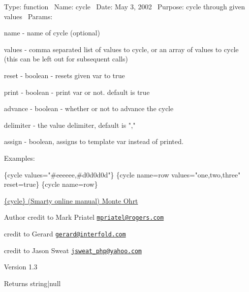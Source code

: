 Type\+: function~\newline
 Name\+: cycle~\newline
 Date\+: May 3, 2002~\newline
 Purpose\+: cycle through given values~\newline
 Params\+: 
\begin{DoxyPre}
\begin{DoxyItemize}
\item name      - name of cycle (optional)
\item values    - comma separated list of values to cycle, or an array of values to cycle
              (this can be left out for subsequent calls)
\item reset     - boolean - resets given var to true
\item print     - boolean - print var or not. default is true
\item advance   - boolean - whether or not to advance the cycle
\item delimiter - the value delimiter, default is ","
\item assign    - boolean, assigns to template var instead of printed.

Examples:~\newline


\begin{DoxyPre}
\{cycle values="#eeeeee,#d0d0d0d"\}
\{cycle name=row values="one,two,three" reset=true\}
\{cycle name=row\}
\end{DoxyPre}

\end{DoxyItemize}\end{DoxyPre}



\begin{DoxyPre}\hyperlink{}{\{cycle\}
      (Smarty online manual)
 Monte Ohrt }
\begin{DoxyAuthor}{Author}
credit to Mark Priatel \href{mailto:mpriatel@rogers.com}{\tt mpriatel@rogers.com}


credit to Gerard \href{mailto:gerard@interfold.com}{\tt gerard@interfold.com}


credit to Jason Sweat \href{mailto:jsweat_php@yahoo.com}{\tt jsweat\_php@yahoo.com}

\end{DoxyAuthor}
\begin{DoxyVersion}{Version}
1.3

\end{DoxyVersion}

\begin{DoxyReturn}{Returns}
string|null

\end{DoxyReturn}
\end{DoxyPre}
